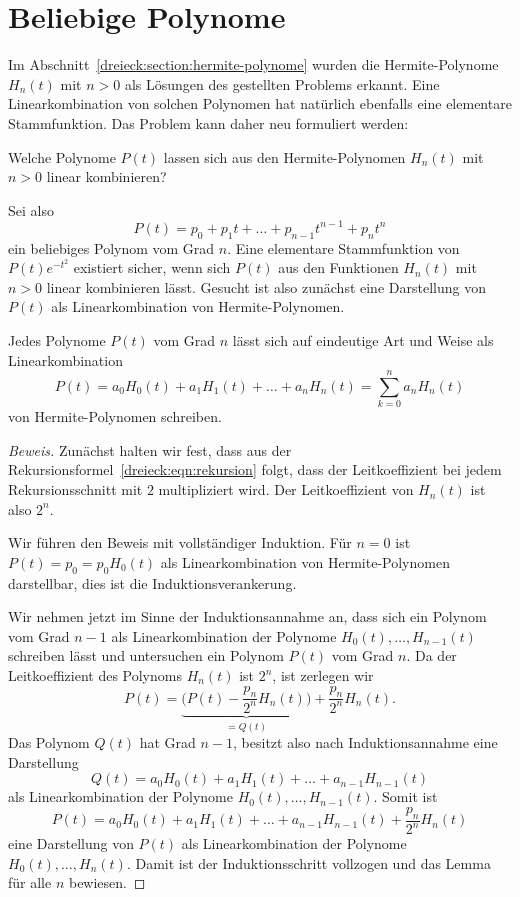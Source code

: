 %
%
%
\section{Beliebige Polynome
\label{dreieck:section:beliebig}}
Im Abschnitt~\ref{dreieck:section:hermite-polynome} wurden die
Hermite-Polynome $H_n(t)$ mit $n>0$ als Lösungen des gestellten
Problems erkannt.
Eine Linearkombination von solchen Polynomen hat natürlich
ebenfalls eine elementare Stammfunktion.
Das Problem kann daher neu formuliert werden:

\begin{problem}
\label{dreieck:problem2}
Welche Polynome $P(t)$ lassen sich aus den Hermite-Polynomen
$H_n(t)$ mit $n>0$ linear kombinieren?
\end{problem}

Sei also
\[
P(t) = p_0 + p_1t + \ldots + p_{n-1}t^{n-1} + p_nt^n
\]
ein beliebiges Polynom vom Grad $n$.
Eine elementare Stammfunktion von $P(t)e^{-t^2}$ existiert sicher,
wenn sich $P(t)$ aus den Funktionen $H_n(t)$ mit $n>0$ linear
kombinieren lässt.
Gesucht ist also zunächst eine Darstellung von $P(t)$ als Linearkombination
von Hermite-Polynomen.

\begin{lemma}
Jedes Polynome $P(t)$ vom Grad $n$ lässt sich auf eindeutige Art und
Weise als Linearkombination
\begin{equation}
P(t) = a_0H_0(t) + a_1H_1(t) + \ldots + a_nH_n(t)
=
\sum_{k=0}^n a_nH_n(t)
\label{dreieck:lemma}
\end{equation}
von Hermite-Polynomen schreiben.
\end{lemma}

\begin{proof}[Beweis]
Zunächst halten wir fest, dass aus der
Rekursionsformel~\eqref{dreieck:eqn:rekursion}
folgt, dass der Leitkoeffizient bei jedem Rekursionsschnitt
mit $2$ multipliziert wird.
Der Leitkoeffizient von $H_n(t)$ ist also $2^n$.

Wir führen den Beweis mit vollständiger Induktion.
Für $n=0$ ist $P(t)=p_0 = p_0 H_0(t)$ als Linearkombination von
Hermite-Polynomen darstellbar, dies ist die Induktionsverankerung.

Wir nehmen jetzt im Sinne der Induktionsannahme an,
dass sich ein Polynom vom Grad $n-1$ als
Linearkombination der Polynome $H_0(t),\dots,H_{n-1}(t)$ schreiben
lässt und untersuchen ein Polynom $P(t)$ vom Grad $n$.
Da der Leitkoeffizient des Polynoms $H_n(t)$ ist $2^n$, ist zerlegen
wir
\[
P(t)
=
\underbrace{\biggl(P(t) - \frac{p_n}{2^n} H_n(t)\biggr)}_{\displaystyle = Q(t)}
+
\frac{p_n}{2^n} H_n(t).
\]
Das Polynom $Q(t)$ hat Grad $n-1$, besitzt also nach Induktionsannahme
eine Darstellung
\[
Q(t) = a_0H_0(t)+a_1H_1(t)+\ldots+a_{n-1}H_{n-1}(t)
\]
als Linearkombination der Polynome $H_0(t),\dots,H_{n-1}(t)$.
Somit ist
\[
P(t)
= a_0H_0(t)+a_1H_1(t)+\ldots+a_{n-1}H_{n-1}(t) +
\frac{p_n}{2^n} H_n(t)
\]
eine Darstellung von $P(t)$ als Linearkombination der Polynome
$H_0(t),\dots,H_n(t)$.
Damit ist der Induktionsschritt vollzogen und das Lemma für alle
$n$ bewiesen.
\end{proof}

